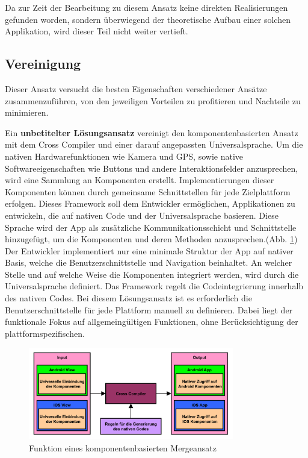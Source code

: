 Da zur Zeit der Bearbeitung zu diesem Ansatz keine direkten Realisierungen gefunden worden, sondern überwiegend der theoretische Aufbau einer solchen Applikation, wird dieser Teil nicht weiter vertieft.

\subsection{Vereinigung}
Dieser Ansatz versucht die besten Eigenschaften verschiedener Ansätze zusammenzuführen, von den jeweiligen Vorteilen zu profitieren und Nachteile zu minimieren.

\medskip
Ein \textbf{unbetitelter Lösungsansatz} vereinigt den komponentenbasierten Ansatz mit dem Cross Compiler und einer darauf angepassten Universalsprache. Um die nativen Hardwarefunktionen wie Kamera und GPS, sowie native Softwareeigenschaften wie Buttons und andere Interaktionsfelder anzusprechen, wird eine Sammlung an Komponenten erstellt. Implementierungen dieser Komponenten können durch gemeinsame Schnittstellen für jede Zielplattform erfolgen. Dieses Framework soll dem Entwickler ermöglichen, Applikationen zu entwickeln, die auf nativen Code und der Universalsprache basieren. Diese Sprache wird der App als zusätzliche Kommunikationsschicht und Schnittstelle hinzugefügt, um die Komponenten und deren Methoden anzusprechen.(Abb. \ref{graph_merge_component_based}) Der Entwickler implementiert nur eine minimale Struktur der App auf nativer Basis, welche die Benutzerschnittstelle und Navigation beinhaltet. An welcher Stelle und auf welche Weise die Komponenten integriert werden, wird durch die Universalsprache definiert. Das Framework regelt die Codeintegrierung innerhalb des nativen Codes. Bei diesem Lösungsansatz ist es erforderlich die Benutzerschnittstelle für jede Plattform manuell zu definieren. Dabei liegt der funktionale Fokus auf allgemeingültigen Funktionen, ohne Berücksichtigung der plattformspezifischen.

\begin{figure}[htbp]
	\centering
	\includegraphics[width=0.8\textwidth]{Bilder/Merge_Component_based}
	\caption{Funktion eines komponentenbasierten Mergeansatz}\label{graph_merge_component_based}
\end{figure}

